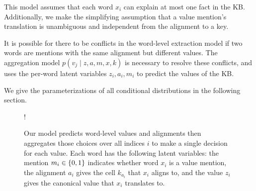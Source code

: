 \documentclass[12pt]{article}
\begin{document}
This model assumes that each word $x_i$ can explain at most one fact in the KB.
Additionally, we make the simplifying assumption
that a value mention's translation is unambiguous and independent from the alignment to a key.

It is possible for there to be conflicts in the word-level extraction model if 
two words are mentions with the same alignment but different values.
The aggregation model $p(v_j \mid z,a,m,x,k)$ is necessary to resolve these conflicts,
and uses the per-word latent variables $z_i,a_i,m_i$ to predict the values of the KB.

We give the parameterizations of all conditional distributions in the following section.

\begin{figure}[h]
\begin{center}
\resizebox {.35\columnwidth} {!} {
} %
\end{center}
\caption{Our model predicts word-level values and alignments
then aggregates those choices over all indices $i$ to
make a single decision for each value.
Each word has the following latent variables:
the mention $m_i \in \left\{0,1\right\}$ indicates whether word $x_i$ is a value mention,
the alignment $a_i$ gives the cell $k_{a_i}$ that $x_i$ aligns to,
and the value $z_i$ gives the canonical value that $x_i$ translates to.
}
\label{fig:infmodel}
\end{figure}
\end{document}
